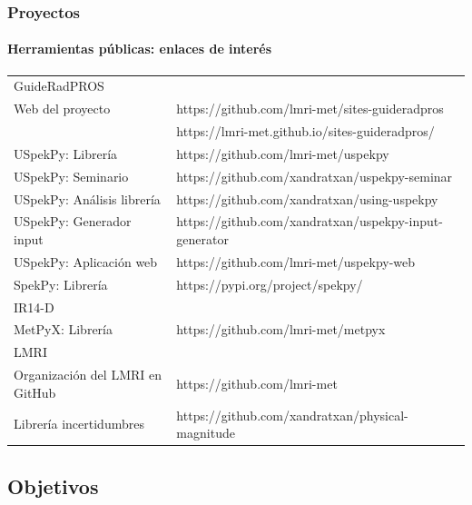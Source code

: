 \documentclass{beamer}
\begin{document}
	\begin{frame}
		\frametitle{Proyectos}
		\framesubtitle{Herramientas públicas: enlaces de interés}
		\centering
		\scriptsize
		\begin{tabular}{ll}			
			\rowcolor{blue!40}
			{\color{white}GuideRadPROS}&\\
			Web del proyecto&https://github.com/lmri-met/sites-guideradpros\\
			&https://lmri-met.github.io/sites-guideradpros/\\
			USpekPy: Librería&https://github.com/lmri-met/uspekpy\\
			USpekPy: Seminario&https://github.com/xandratxan/uspekpy-seminar\\
			USpekPy: Análisis librería&https://github.com/xandratxan/using-uspekpy\\
			USpekPy: Generador input&https://github.com/xandratxan/uspekpy-input-generator\\
			USpekPy: Aplicación web&https://github.com/lmri-met/uspekpy-web\\
			SpekPy: Librería&https://pypi.org/project/spekpy/\\
			\rowcolor{blue!40}
			{\color{white}IR14-D}&\\
			MetPyX: Librería&https://github.com/lmri-met/metpyx\\
			\rowcolor{blue!40}
			{\color{white}LMRI}&\\
			Organización del LMRI en GitHub&https://github.com/lmri-met\\
			Librería incertidumbres&https://github.com/xandratxan/physical-magnitude\\
		\end{tabular}
	\end{frame}
	
	\subsection{Objetivos}
\end{document}
